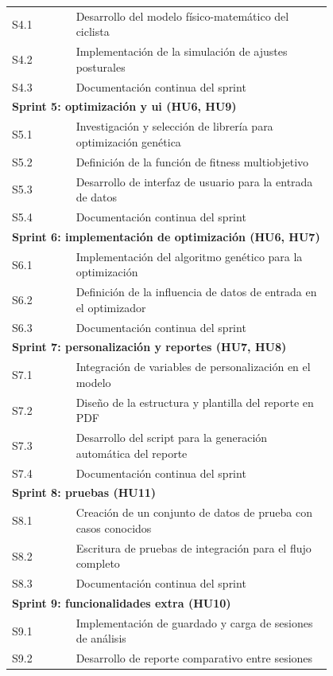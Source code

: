 \documentclass[
11pt, %
]{charter}
\begin{document}
\begin{longtable}{|l|p{0.8\linewidth}|}
S4.1 & Desarrollo del modelo físico-matemático del ciclista \\
S4.2 & Implementación de la simulación de ajustes posturales \\
S4.3 & Documentación continua del sprint \\ \hline
\multicolumn{2}{l}{\textbf{Sprint 5: optimización y ui (HU6, HU9)}} \\
S5.1 & Investigación y selección de librería para optimización genética \\
S5.2 & Definición de la función de fitness multiobjetivo \\
S5.3 & Desarrollo de interfaz de usuario para la entrada de datos \\
S5.4 & Documentación continua del sprint \\ \hline
\multicolumn{2}{l}{\textbf{Sprint 6: implementación de optimización (HU6, HU7)}} \\
S6.1 & Implementación del algoritmo genético para la optimización \\
S6.2 & Definición de la influencia de datos de entrada en el optimizador \\
S6.3 & Documentación continua del sprint \\ \hline
\multicolumn{2}{l}{\textbf{Sprint 7: personalización y reportes (HU7, HU8)}} \\
S7.1 & Integración de variables de personalización en el modelo \\
S7.2 & Diseño de la estructura y plantilla del reporte en PDF \\
S7.3 & Desarrollo del script para la generación automática del reporte \\
S7.4 & Documentación continua del sprint \\ \hline
\multicolumn{2}{l}{\textbf{Sprint 8: pruebas (HU11)}} \\
S8.1 & Creación de un conjunto de datos de prueba con casos conocidos \\
S8.2 & Escritura de pruebas de integración para el flujo completo \\
S8.3 & Documentación continua del sprint \\ \hline
\multicolumn{2}{l}{\textbf{Sprint 9: funcionalidades extra (HU10)}} \\
S9.1 & Implementación de guardado y carga de sesiones de análisis \\
S9.2 & Desarrollo de reporte comparativo entre sesiones \\

\end{longtable}
\end{document}
